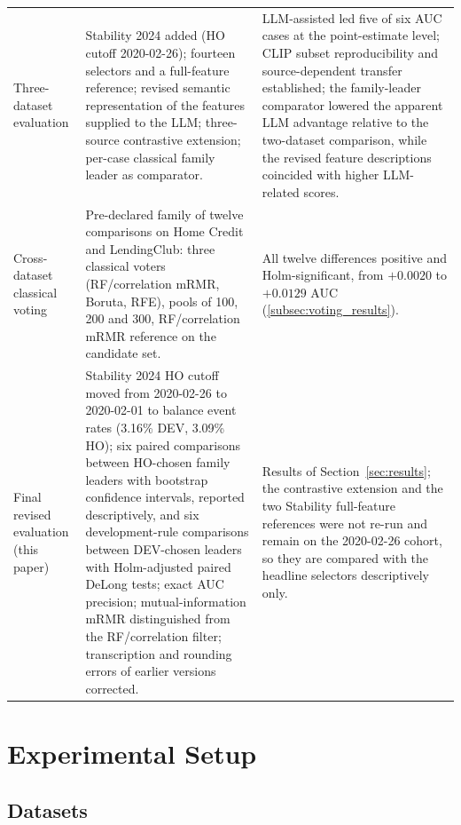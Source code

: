 \documentclass[final,5p,twocolumn]{elsarticle}
\begin{document}
\begin{table}[htbp]
\begin{threeparttable}
\begin{tabular}{@{}L{27mm}L{\dimexpr(\textwidth-27mm-4\tabcolsep)/2\relax}L{\dimexpr(\textwidth-27mm-4\tabcolsep)/2\relax}@{}}
\addlinespace
Three-dataset evaluation & Stability 2024 added (HO cutoff 2020-02-26); fourteen selectors and a full-feature reference; revised semantic representation of the features supplied to the LLM; three-source contrastive extension; per-case classical family leader as comparator. & LLM-assisted led five of six AUC cases at the point-estimate level; CLIP subset reproducibility and source-dependent transfer established; the family-leader comparator lowered the apparent LLM advantage relative to the two-dataset comparison, while the revised feature descriptions coincided with higher LLM-related scores. \\
\addlinespace
Cross-dataset classical voting & Pre-declared family of twelve comparisons on Home Credit and LendingClub: three classical voters (RF/correlation mRMR, Boruta, RFE), pools of 100, 200 and 300, RF/correlation mRMR reference on the candidate set. & All twelve differences positive and Holm-significant, from $+0.0020$ to $+0.0129$ AUC (\ref{subsec:voting_results}). \\
\addlinespace
Final revised evaluation (this paper) & Stability 2024 HO cutoff moved from 2020-02-26 to 2020-02-01 to balance event rates (3.16\% DEV, 3.09\% HO); six paired comparisons between HO-chosen family leaders with bootstrap confidence intervals, reported descriptively, and six development-rule comparisons between DEV-chosen leaders with Holm-adjusted paired DeLong tests; exact AUC precision; mutual-information mRMR distinguished from the RF/correlation filter; transcription and rounding errors of earlier versions corrected. & Results of Section~\ref{sec:results}; the contrastive extension and the two Stability full-feature references were not re-run and remain on the 2020-02-26 cohort, so they are compared with the headline selectors descriptively only. \\
\bottomrule
\end{tabular}
\end{threeparttable}
\end{table}


\section{Experimental Setup}
\label{sec:experimental_setup}

\subsection{Datasets}
\label{subsec:datasets}
\end{document}
